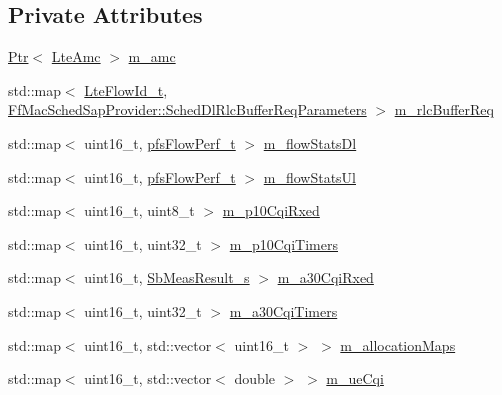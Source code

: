 \subsection*{Private Attributes}
\begin{DoxyCompactItemize}
\item 
\hyperlink{classns3_1_1Ptr}{Ptr}$<$ \hyperlink{classns3_1_1LteAmc}{Lte\+Amc} $>$ \hyperlink{classns3_1_1PfFfMacScheduler_a8ed3fd6ae921b6161a10c2c9b0e869a4}{m\+\_\+amc}
\item 
std\+::map$<$ \hyperlink{structns3_1_1LteFlowId__t}{Lte\+Flow\+Id\+\_\+t}, \hyperlink{structns3_1_1FfMacSchedSapProvider_1_1SchedDlRlcBufferReqParameters}{Ff\+Mac\+Sched\+Sap\+Provider\+::\+Sched\+Dl\+Rlc\+Buffer\+Req\+Parameters} $>$ \hyperlink{classns3_1_1PfFfMacScheduler_aaad15dd674acb600fb8dc9263fcfa2bc}{m\+\_\+rlc\+Buffer\+Req}
\item 
std\+::map$<$ uint16\+\_\+t, \hyperlink{structns3_1_1pfsFlowPerf__t}{pfs\+Flow\+Perf\+\_\+t} $>$ \hyperlink{classns3_1_1PfFfMacScheduler_a00b148349167b85ab9170570e2530b92}{m\+\_\+flow\+Stats\+Dl}
\item 
std\+::map$<$ uint16\+\_\+t, \hyperlink{structns3_1_1pfsFlowPerf__t}{pfs\+Flow\+Perf\+\_\+t} $>$ \hyperlink{classns3_1_1PfFfMacScheduler_a1c3919a5dcda7ca29e667e2bca774ca5}{m\+\_\+flow\+Stats\+Ul}
\item 
std\+::map$<$ uint16\+\_\+t, uint8\+\_\+t $>$ \hyperlink{classns3_1_1PfFfMacScheduler_a06151884f0dc769c017ceb00b3a8f409}{m\+\_\+p10\+Cqi\+Rxed}
\item 
std\+::map$<$ uint16\+\_\+t, uint32\+\_\+t $>$ \hyperlink{classns3_1_1PfFfMacScheduler_a5e1e3c699bc1b53b4c11f5bb454f7e1f}{m\+\_\+p10\+Cqi\+Timers}
\item 
std\+::map$<$ uint16\+\_\+t, \hyperlink{structns3_1_1SbMeasResult__s}{Sb\+Meas\+Result\+\_\+s} $>$ \hyperlink{classns3_1_1PfFfMacScheduler_a4bf7d1844112028aa3f7bc21e580a7bd}{m\+\_\+a30\+Cqi\+Rxed}
\item 
std\+::map$<$ uint16\+\_\+t, uint32\+\_\+t $>$ \hyperlink{classns3_1_1PfFfMacScheduler_abfaea62231103e914d6d66d66a127966}{m\+\_\+a30\+Cqi\+Timers}
\item 
std\+::map$<$ uint16\+\_\+t, std\+::vector$<$ uint16\+\_\+t $>$ $>$ \hyperlink{classns3_1_1PfFfMacScheduler_a372b18540784762ebc10292caf8ca40f}{m\+\_\+allocation\+Maps}
\item 
std\+::map$<$ uint16\+\_\+t, std\+::vector$<$ double $>$ $>$ \hyperlink{classns3_1_1PfFfMacScheduler_acf67c0074356c705e8bd89bb49ddd5ad}{m\+\_\+ue\+Cqi}
\item 

\end{DoxyCompactItemize}
